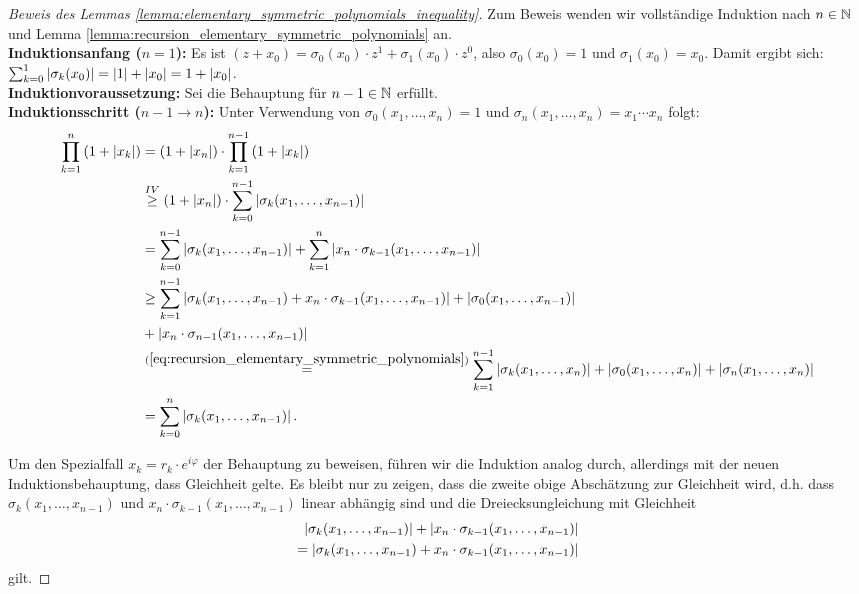 \begin{proof}[Beweis des Lemmas \ref{lemma:elementary_symmetric_polynomials_inequality}]
    Zum Beweis wenden wir vollständige Induktion nach $n \in \mathbb{N}$ und
    Lemma \ref{lemma:recursion_elementary_symmetric_polynomials} an.\\[0.5em]
    \textbf{Induktionsanfang (\boldmath$n=1$):}
    Es ist $ (z+x_0) = \sigma_0(x_0) \cdot z^1 + \sigma_1(x_0) \cdot z^0$,
    also $\sigma_0(x_0) = 1$ und $\sigma_1(x_0) = x_0$.
    Damit ergibt sich: $\sum_{k=0}^{1} \left\lvert \sigma_k(x_0) \right\rvert = \left\lvert 1 \right\rvert + \left\lvert x_0 \right\rvert = 1 + \left\lvert x_0 \right\rvert$.\\[0.5em]
%
    \noindent \textbf{Induktionvoraussetzung:}
    Sei die Behauptung für $n-1 \in \mathbb{N}$ erfüllt.\\[0.5em]
%
    \noindent \textbf{Induktionsschritt (\boldmath $n\!-\!1 \rightarrow n$):}
    Unter Verwendung von $\sigma_{0}(x_1, \dots, x_n) = 1$
    und $\sigma_{n}(x_1, \dots, x_n) = x_1 \cdots x_n$ folgt:
    \begin{equation*}
      \begin{split}
        \prod_{k=1}^{n} \left( 1 + \left\lvert x_k \right\rvert \right)
        &= ( 1 + \left\lvert x_n \right\rvert ) \cdot \prod_{k=1}^{n-1} \left( 1 + \left\lvert x_k \right\rvert \right)\\
        &\overset{IV}{\geq}  ( 1 + \left\lvert x_n \right\rvert ) \cdot \sum_{k=0}^{n-1} \left\lvert \sigma_{k}(x_1, \dots, x_{n-1}) \right\rvert\\
        &= \sum_{k=0}^{n-1} \left\lvert \sigma_{k}(x_1, \dots, x_{n-1}) \right\rvert
        + \sum_{k=1}^{n} \left\lvert x_n \cdot \sigma_{k-1}(x_1, \dots, x_{n-1}) \right\rvert\\
        &\geq \sum_{k=1}^{n-1} \left\lvert \sigma_{k}(x_1, \dots, x_{n-1}) + x_n \cdot \sigma_{k-1}(x_1, \dots, x_{n-1}) \right\rvert + \left\lvert \sigma_{0}(x_1, \dots, x_{n-1}) \right\rvert\\
        &+ \left\lvert x_n \cdot \sigma_{n-1}(x_1, \dots, x_{n-1}) \right\rvert\\
        &\overset{(\ref{eq:recursion_elementary_symmetric_polynomials})}{=}
        \sum_{k=1}^{n-1} \left\lvert \sigma_{k}(x_1, \dots, x_{n}) \right\rvert + \left\lvert \sigma_{0}(x_1, \dots, x_{n}) \right\rvert + \left\lvert \sigma_{n}(x_1, \dots, x_n) \right\rvert\\
        &= \sum_{k=0}^{n} \left\lvert \sigma_{k}(x_1, \dots, x_{n-1}) \right\rvert.
      \end{split}
    \end{equation*}

    Um den Spezialfall $x_k = r_k \cdot e^{i \varphi}$ der Behauptung zu beweisen,
    führen wir die Induktion analog durch, allerdings mit der neuen
    Induktionsbehauptung, dass Gleichheit gelte.  Es bleibt nur zu zeigen, dass
    die zweite obige Abschätzung zur Gleichheit wird, d.h. dass
    $\sigma_{k}(x_1, \dots, x_{n-1})$ und $x_n \cdot \sigma_{k-1}(x_1, \dots, x_{n-1})$
    linear abhängig sind und die Dreiecksungleichung mit Gleichheit
    \[
        \begin{split}
            \left\lvert \sigma_{k}(x_1, \dots, x_{n-1}) \right\rvert + \left\lvert x_n \cdot \sigma_{k-1}(x_1, \dots, x_{n-1}) \right\rvert\\
            = \left\lvert \sigma_{k}(x_1, \dots, x_{n-1}) + x_n \cdot \sigma_{k-1}(x_1, \dots, x_{n-1}) \right\rvert
        \end{split}
    \]
    gilt.


\end{proof}
